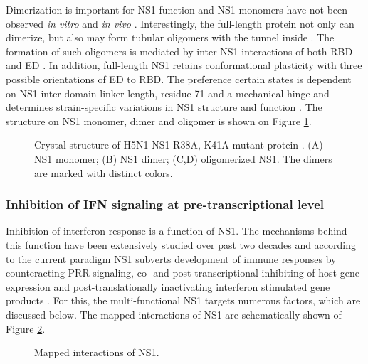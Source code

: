 		Dimerization is important for \gls{NS1} function and \gls{NS1} monomers have not been observed \textit{in vitro} and \textit{in vivo} \parencite{Hale2014}. Interestingly, the full-length protein not only can dimerize, but also may form tubular oligomers with the tunnel inside \parencite{Bornholdt2008}. The formation of such oligomers is mediated by inter-NS1 interactions of both \gls{RBD} and \gls{ED} \parencite{Bornholdt2008, Carrillo2014}. In addition, full-length \gls{NS1} retains conformational plasticity with three possible orientations of \gls{ED} to \gls{RBD}. The preference certain states is dependent on \gls{NS1} inter-domain linker length, residue 71 and a mechanical hinge and determines strain-specific variations in \gls{NS1} structure and function \parencite{Carrillo2014}. The structure on NS1 monomer, dimer and oligomer is shown on Figure \ref{fig:structure}.
		
		\begin{figure}[h]
			\centering
			\caption{Crystal structure of H5N1 NS1 R38A, K41A mutant protein \parencite{Bornholdt2008}. (A) NS1 monomer; (B) NS1 dimer; (C,D) oligomerized NS1. The dimers are marked with distinct colors.} \label{fig:structure}
		\end{figure}
		
	
		\subsubsection{Inhibition of IFN signaling at pre-transcriptional level}
		
		Inhibition of interferon response is a function of NS1. The mechanisms behind this function have been extensively studied over past two decades and according to the current paradigm NS1 subverts development of immune responses by counteracting PRR signaling, co- and post-transcriptional inhibiting of host gene expression and post-translationally inactivating  interferon stimulated gene products \parencite{Ayllon2014}.	For this, the multi-functional NS1 targets numerous factors, which are discussed below. The mapped interactions of NS1 are schematically shown of Figure \ref{fig:NS1}.
		
		\begin{figure}[h]
			\centering
			\caption{Mapped interactions of NS1.} \label{fig:NS1}
		\end{figure}
				
